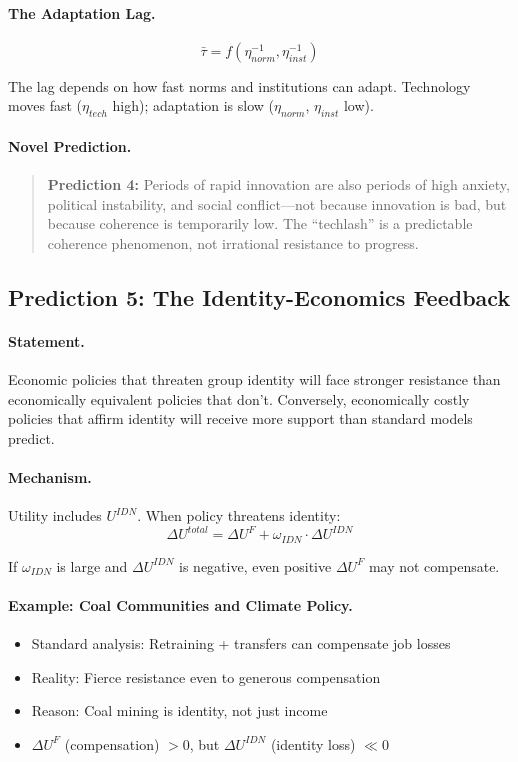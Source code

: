\documentclass[12pt,a4paper]{article}
\begin{document}
\paragraph{The Adaptation Lag.}
\begin{equation}
  \bar{\tau} = f(\eta_{norm}^{-1}, \eta_{inst}^{-1})
\end{equation}

The lag depends on how fast norms and institutions can adapt.
Technology moves fast ($\eta_{tech}$ high);
adaptation is slow ($\eta_{norm}$, $\eta_{inst}$ low).

\paragraph{Novel Prediction.}
\begin{quote}
\textbf{Prediction 4:} Periods of rapid innovation are also periods of
high anxiety, political instability, and social conflict---not because
innovation is bad, but because coherence is temporarily low.
The ``techlash'' is a predictable coherence phenomenon, not irrational
resistance to progress.
\end{quote}

\subsection{Prediction 5: The Identity-Economics Feedback}

\paragraph{Statement.}
Economic policies that threaten group identity will face stronger
resistance than economically equivalent policies that don't.
Conversely, economically costly policies that affirm identity
will receive more support than standard models predict.

\paragraph{Mechanism.}
Utility includes $U^{IDN}$. When policy threatens identity:
\begin{equation}
  \Delta U^{total} = \Delta U^F + \omega_{IDN} \cdot \Delta U^{IDN}
\end{equation}

If $\omega_{IDN}$ is large and $\Delta U^{IDN}$ is negative,
even positive $\Delta U^F$ may not compensate.

\paragraph{Example: Coal Communities and Climate Policy.}
\begin{itemize}
  \item Standard analysis: Retraining + transfers can compensate job losses
  \item Reality: Fierce resistance even to generous compensation
  \item Reason: Coal mining is identity, not just income
  \item $\Delta U^F$ (compensation) $> 0$, but $\Delta U^{IDN}$ (identity loss) $\ll 0$
\end{itemize}
\end{document}
